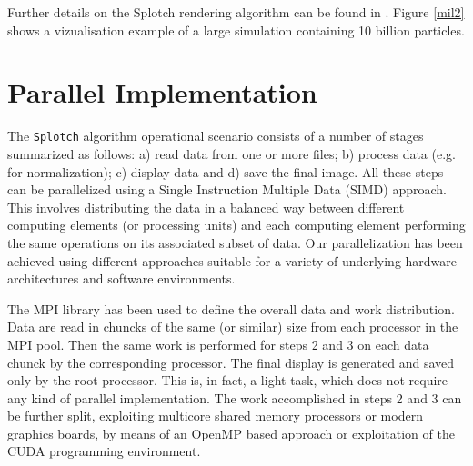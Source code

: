 %

Further details on the Splotch rendering algorithm can be found in \citep{2008NJPh...10l5006D}. 
Figure \ref{mil2} shows a vizualisation example of a large simulation 
containing 10 billion particles.

\section{Parallel Implementation}
\label{parallel}

The {\tt Splotch} algorithm operational scenario consists of a number of 
stages summarized as follows: a) read data from one or more files; b) process data (e.g. for normalization); c) display data and d) save the final image. All these steps can be parallelized using a 
Single Instruction Multiple Data (SIMD) approach. This involves distributing the data 
in a balanced way between different computing elements (or processing units) and each computing element performing the same operations on its associated subset of data. Our parallelization has been achieved using different approaches suitable for a variety of underlying hardware architectures and software environments.

The MPI library \cite{mpi} has been used to define the overall data and work 
distribution. Data are read in chuncks of the same (or similar) size from each processor 
in the MPI pool. Then the same work is performed for steps 2 and 3 on each data chunck by the 
corresponding processor. The final display is generated and saved only by the root processor. This is, in fact, a light task, which does not require any kind of parallel implementation. 
The work accomplished in steps 2 and 3 can be further split, exploiting 
multicore shared memory processors or modern graphics boards, by means of
an OpenMP \cite{openmp} based approach or exploitation of the CUDA \cite{cuda} programming 
environment. 

